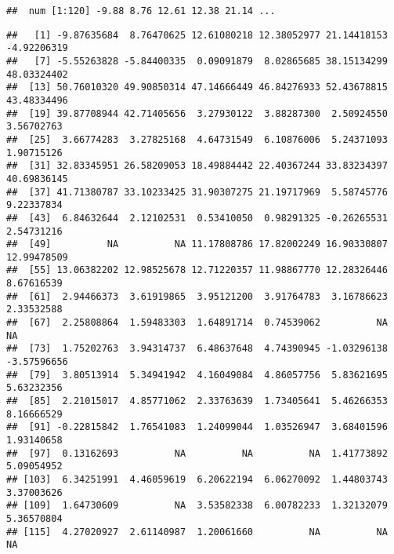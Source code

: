 \documentclass[
]{article}
\newenvironment{Shaded}{\begin{snugshade}}{\end{snugshade}}
\newcommand{\FunctionTok}[1]{\textcolor[rgb]{0.13,0.29,0.53}{\textbf{#1}}}
\newcommand{\NormalTok}[1]{#1}
\newcommand{\SpecialCharTok}[1]{\textcolor[rgb]{0.81,0.36,0.00}{\textbf{#1}}}
\begin{document}
\begin{Shaded}
\end{Shaded}

\begin{verbatim}
##  num [1:120] -9.88 8.76 12.61 12.38 21.14 ...
\end{verbatim}

\begin{Shaded}
\end{Shaded}

\begin{verbatim}
##   [1] -9.87635684  8.76470625 12.61080218 12.38052977 21.14418153 -4.92206319
##   [7] -5.55263828 -5.84400335  0.09091879  8.02865685 38.15134299 48.03324402
##  [13] 50.76010320 49.90850314 47.14666449 46.84276933 52.43678815 43.48334496
##  [19] 39.87708944 42.71405656  3.27930122  3.88287300  2.50924550  3.56702763
##  [25]  3.66774283  3.27825168  4.64731549  6.10876006  5.24371093  1.90715126
##  [31] 32.83345951 26.58209053 18.49884442 22.40367244 33.83234397 40.69836145
##  [37] 41.71380787 33.10233425 31.90307275 21.19717969  5.58745776  9.22337834
##  [43]  6.84632644  2.12102531  0.53410050  0.98291325 -0.26265531  2.54731216
##  [49]          NA          NA 11.17808786 17.82002249 16.90330807 12.99478509
##  [55] 13.06382202 12.98525678 12.71220357 11.98867770 12.28326446  8.67616539
##  [61]  2.94466373  3.61919865  3.95121200  3.91764783  3.16786623  2.33532588
##  [67]  2.25808864  1.59483303  1.64891714  0.74539062          NA          NA
##  [73]  1.75202763  3.94314737  6.48637648  4.74390945 -1.03296138 -3.57596656
##  [79]  3.80513914  5.34941942  4.16049084  4.86057756  5.83621695  5.63232356
##  [85]  2.21015017  4.85771062  2.33763639  1.73405641  5.46266353  8.16666529
##  [91] -0.22815842  1.76541083  1.24099044  1.03526947  3.68401596  1.93140658
##  [97]  0.13162693          NA          NA          NA  1.41773892  5.09054952
## [103]  6.34251991  4.46059619  6.20622194  6.06270092  1.44803743  3.37003626
## [109]  1.64730609          NA  3.53582338  6.00782233  1.32132079  5.36570804
## [115]  4.27020927  2.61140987  1.20061660          NA          NA          NA
\end{verbatim}
\end{document}
